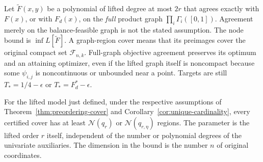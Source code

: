 Let $\widetilde F(x,y)$ be a polynomial of lifted degree at most $2r$
that agrees exactly with $F(x)$, or with $F_d(x)$, on the \emph{full}
product graph $\prod_i\Gamma_i([0,1])$. Agreement merely on the
balance-feasible graph is not the stated assumption. The node bound is
$\inf L[\widetilde F]$. A graph-region cover means that its preimages
cover the original compact set $\mathcal F_{n,k}$. Full-graph objective
agreement preserves its optimum and an attaining optimizer, even if the
lifted graph itself is noncompact because some $\psi_{i,j}$ is
noncontinuous or unbounded near a point. Targets are still
$T_*=1/4-\epsilon$ or $T_*=F_d^*-\epsilon$.

\begin{theorem}
\label{thm:local-graph-lift}
For the lifted model just defined, under the respective assumptions of
Theorem~\ref{thm:preordering-cover} and
Corollary~\ref{cor:unique-cardinality}, every certified cover has at
least $\mathcal N(q_r)$ or $\mathcal N(q_{r,\eta})$ regions.
The parameter is the lifted order $r$ itself, independent of the number
or polynomial degrees of the univariate auxiliaries. The dimension in
the bound is the number $n$ of original coordinates.
\end{theorem}
